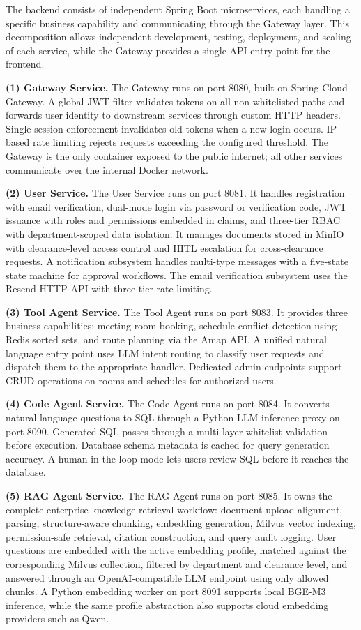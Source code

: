 The backend consists of independent Spring Boot microservices, each handling a specific business capability and communicating through the Gateway layer. This decomposition allows independent development, testing, deployment, and scaling of each service, while the Gateway provides a single API entry point for the frontend.

\textbf{(1) Gateway Service.} The Gateway runs on port 8080, built on Spring Cloud Gateway. A global JWT filter validates tokens on all non-whitelisted paths and forwards user identity to downstream services through custom HTTP headers. Single-session enforcement invalidates old tokens when a new login occurs. IP-based rate limiting rejects requests exceeding the configured threshold. The Gateway is the only container exposed to the public internet; all other services communicate over the internal Docker network.

\textbf{(2) User Service.} The User Service runs on port 8081. It handles registration with email verification, dual-mode login via password or verification code, JWT issuance with roles and permissions embedded in claims, and three-tier RBAC with department-scoped data isolation. It manages documents stored in MinIO with clearance-level access control and HITL escalation for cross-clearance requests. A notification subsystem handles multi-type messages with a five-state state machine for approval workflows. The email verification subsystem uses the Resend HTTP API with three-tier rate limiting.

\textbf{(3) Tool Agent Service.} The Tool Agent runs on port 8083. It provides three business capabilities: meeting room booking, schedule conflict detection using Redis sorted sets, and route planning via the Amap API. A unified natural language entry point uses LLM intent routing to classify user requests and dispatch them to the appropriate handler. Dedicated admin endpoints support CRUD operations on rooms and schedules for authorized users.

\textbf{(4) Code Agent Service.} The Code Agent runs on port 8084. It converts natural language questions to SQL through a Python LLM inference proxy on port 8090. Generated SQL passes through a multi-layer whitelist validation before execution. Database schema metadata is cached for query generation accuracy. A human-in-the-loop mode lets users review SQL before it reaches the database.

\textbf{(5) RAG Agent Service.} The RAG Agent runs on port 8085. It owns the complete enterprise knowledge retrieval workflow: document upload alignment, parsing, structure-aware chunking, embedding generation, Milvus vector indexing, permission-safe retrieval, citation construction, and query audit logging. User questions are embedded with the active embedding profile, matched against the corresponding Milvus collection, filtered by department and clearance level, and answered through an OpenAI-compatible LLM endpoint using only allowed chunks. A Python embedding worker on port 8091 supports local BGE-M3 inference, while the same profile abstraction also supports cloud embedding providers such as Qwen.

